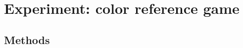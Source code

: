 \documentclass[10pt,letterpaper]{article}
\begin{document}
%
%

\section{Experiment: color reference game}

\subsection{Methods}
\end{document}
